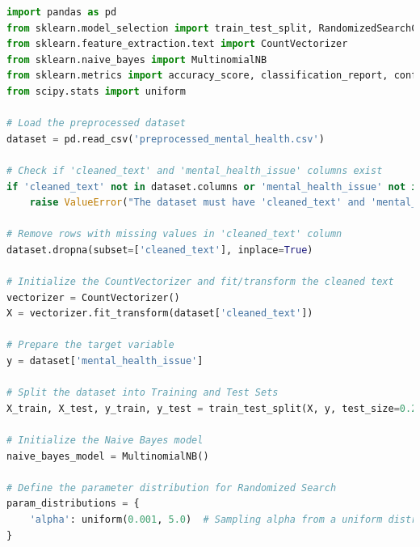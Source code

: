\begin{tcolorbox}[colback=gray!5!white, colframe=gray!80!black, boxrule=0.5pt, title=Naive Bayes]
    \begin{lstlisting}[language=Python]
import pandas as pd
from sklearn.model_selection import train_test_split, RandomizedSearchCV
from sklearn.feature_extraction.text import CountVectorizer
from sklearn.naive_bayes import MultinomialNB
from sklearn.metrics import accuracy_score, classification_report, confusion_matrix
from scipy.stats import uniform

# Load the preprocessed dataset
dataset = pd.read_csv('preprocessed_mental_health.csv')

# Check if 'cleaned_text' and 'mental_health_issue' columns exist
if 'cleaned_text' not in dataset.columns or 'mental_health_issue' not in dataset.columns:
    raise ValueError("The dataset must have 'cleaned_text' and 'mental_health_issue' columns.")

# Remove rows with missing values in 'cleaned_text' column
dataset.dropna(subset=['cleaned_text'], inplace=True)

# Initialize the CountVectorizer and fit/transform the cleaned text
vectorizer = CountVectorizer()
X = vectorizer.fit_transform(dataset['cleaned_text'])

# Prepare the target variable
y = dataset['mental_health_issue']

# Split the dataset into Training and Test Sets
X_train, X_test, y_train, y_test = train_test_split(X, y, test_size=0.2, random_state=42)

# Initialize the Naive Bayes model
naive_bayes_model = MultinomialNB()

# Define the parameter distribution for Randomized Search
param_distributions = {
    'alpha': uniform(0.001, 5.0)  # Sampling alpha from a uniform distribution
}
\end{lstlisting}
\end{tcolorbox}

